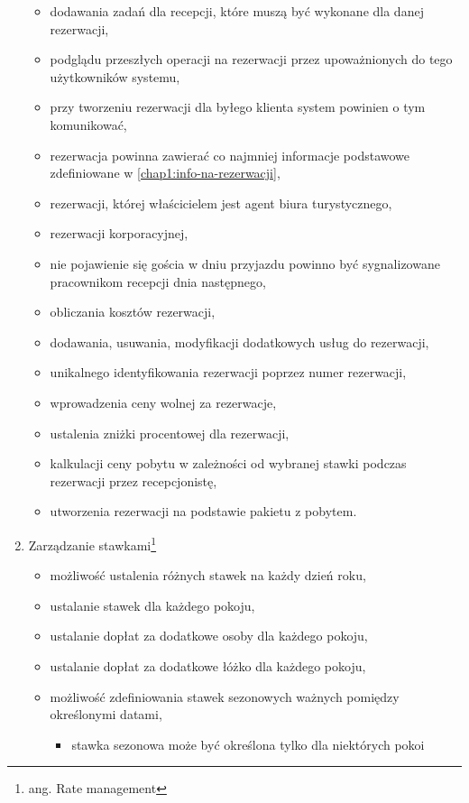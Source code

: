 \documentclass[a4paper,onecolumn,oneside,11pt,wide,floatssmall]{mwrep}
\theoremstyle{definition}
\theoremstyle{plain}%
\theoremstyle{remark}
\begin{document}
\begin{enumerate}
\begin{itemize}
      \item dodawania zadań dla recepcji, które muszą być wykonane dla danej rezerwacji,
      \item podglądu przeszłych operacji na rezerwacji przez upoważnionych do tego użytkowników systemu,
      \item przy tworzeniu rezerwacji dla byłego klienta system powinien o tym komunikować,
      \item rezerwacja powinna zawierać co najmniej informacje podstawowe zdefiniowane w \ref{chap1:info-na-rezerwacji},
      \item rezerwacji, której właścicielem jest agent biura turystycznego,
      \item rezerwacji korporacyjnej,
      \item nie pojawienie się gościa w dniu przyjazdu powinno być sygnalizowane pracownikom recepcji dnia następnego,
      \item obliczania kosztów rezerwacji,
      \item dodawania, usuwania, modyfikacji dodatkowych usług do rezerwacji,
      \item unikalnego identyfikowania rezerwacji poprzez numer rezerwacji,
      \item wprowadzenia ceny wolnej za rezerwacje,
      \item ustalenia zniżki procentowej dla rezerwacji,
      \item kalkulacji ceny pobytu w zależności od wybranej stawki podczas rezerwacji przez recepcjonistę,
      \item utworzenia rezerwacji na podstawie pakietu z pobytem.
    \end{itemize}
  \item Zarządzanie stawkami\footnote{ang. Rate management}
    \begin{itemize}
      \item możliwość ustalenia różnych stawek na każdy dzień roku,
      \item ustalanie stawek dla każdego pokoju,
      \item ustalanie dopłat za dodatkowe osoby dla każdego pokoju,
      \item ustalanie dopłat za dodatkowe łóżko dla każdego pokoju,
      \item możliwość zdefiniowania stawek sezonowych ważnych pomiędzy określonymi datami,
        \begin{itemize}
          \item stawka sezonowa może być określona tylko dla niektórych pokoi

\end{itemize}
\end{itemize}
\end{enumerate}
\end{document}
